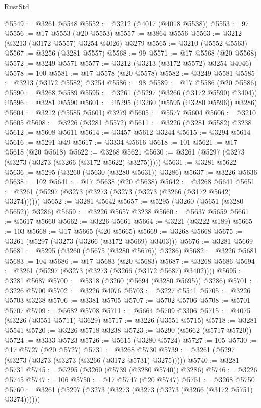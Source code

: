 \begin{lexlean}{RustStd}
\begin{coremodule}
{\begin{coremodule}
{{{{{{{{{{{{{{{{{{{{{{{{{{@5549 := @3261 @5548
@5552 := @3212 (@4017 (@4018 @5538))
@5553 := 97
@5556 := @17 @5553 (@20 @5553)
@5557 := @3864 @5556
@5563 := @3212 (@3213 (@3172 @5557) @3254 @4026) @3279
@5565 := @3210 (@5552 @5563)
@5567 := @3256 (@3281 @5557)
@5568 := 99
@5571 := @17 @5568 (@20 @5568)
@5572 := @3249 @5571
@5577 := @3212 (@3213 (@3172 @5572) @3254 @4046)
@5578 := 100
@5581 := @17 @5578 (@20 @5578)
@5582 := @3249 @5581
@5585 := @3213 (@3172 @5582) @3254
@5586 := 98
@5589 := @17 @5586 (@20 @5586)
@5590 := @3268 @5589
@5595 := @3261 (@5297 (@3266 (@3172 @5590) @3404))
@5596 := @3281 @5590
@5601 := @5295 (@3260 (@5595 (@3280 @5596)) @3286)
@5604 := @3212 (@5585 @5601) @3279
@5605 := @5577 @5604
@5606 := @3210 @5605
@5608 := @3226 (@3281 @5572)
@5611 := @3226 (@3281 @5582) @3238
@5612 := @5608 @5611
@5614 := @3457 @5612 @3244
@5615 := @3294 @5614
@5616 := @5291 @49
@5617 := @3334 @5616
@5618 := 101
@5621 := @17 @5618 (@20 @5618)
@5622 := @3268 @5621
@5630 := @3261 (@5297 (@3273 (@3273 (@3273 (@3266 (@3172 @5622) @3275)))))
@5631 := @3281 @5622
@5636 := @5295 (@3260 (@5630 (@3280 @5631)) @3286)
@5637 := @3226 @5636
@5638 := 102
@5641 := @17 @5638 (@20 @5638)
@5642 := @3268 @5641
@5651 := @3261 (@5297 (@3273 (@3273 (@3273 (@3273 (@3266 (@3172 @5642) @3274))))))
@5652 := @3281 @5642
@5657 := @5295 (@3260 (@5651 (@3280 @5652)) @3286)
@5659 := @3226 @5657 @3238
@5660 := @5637 @5659
@5661 := @5617 @5660
@5662 := @3226 @5661
@5664 := @3221 (@3222 @189)
@5665 := 103
@5668 := @17 @5665 (@20 @5665)
@5669 := @3268 @5668
@5675 := @3261 (@5297 (@3273 (@3266 (@3172 @5669) @3403)))
@5676 := @3281 @5669
@5681 := @5295 (@3260 (@5675 (@3280 @5676)) @3286)
@5682 := @3226 @5681
@5683 := 104
@5686 := @17 @5683 (@20 @5683)
@5687 := @3268 @5686
@5694 := @3261 (@5297 (@3273 (@3273 (@3266 (@3172 @5687) @3402))))
@5695 := @3281 @5687
@5700 := @5318 (@3260 (@5694 (@3280 @5695)) @3286)
@5701 := @3226 @5700
@5702 := @3226 @4076
@5703 := @3227 @5541
@5705 := @3226 @5703 @3238
@5706 := @3381 @5705
@5707 := @5702 @5706
@5708 := @5701 @5707
@5709 := @5682 @5708
@5711 := @5664 @5709 @3306
@5715 := @4075 (@3226 (@3551 @5711) @3629)
@5717 := @3226 (@3551 @5715)
@5718 := @3281 @5541
@5720 := @3226 @5718 @3238
@5723 := @5290 (@5662 (@5717 @5720))
@5724 := @3333 @5723
@5726 := @5615 (@3280 @5724)
@5727 := 105
@5730 := @17 @5727 (@20 @5727)
@5731 := @3268 @5730
@5739 := @3261 (@5297 (@3273 (@3273 (@3273 (@3266 (@3172 @5731) @3275)))))
@5740 := @3281 @5731
@5745 := @5295 (@3260 (@5739 (@3280 @5740)) @3286)
@5746 := @3226 @5745
@5747 := 106
@5750 := @17 @5747 (@20 @5747)
@5751 := @3268 @5750
@5760 := @3261 (@5297 (@3273 (@3273 (@3273 (@3273 (@3266 (@3172 @5751) @3274))))))
}}}}}}}}}}}}}}}}}}}}}}}}}}
\end{coremodule}}
\end{coremodule}
\end{lexlean}
